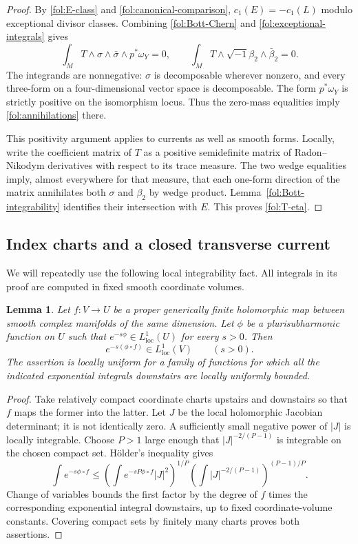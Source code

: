 \documentclass[11pt,letterpaper]{article}
\newtheorem{lemma}[theorem]{Lemma}
\theoremstyle{definition}
\theoremstyle{remark}
\begin{document}
\begin{proof}
By \eqref{fol:E-class} and \eqref{fol:canonical-comparison},
$c_1(E)=-c_1(L)$ modulo exceptional divisor classes.  Combining
\eqref{fol:Bott-Chern} and \eqref{fol:exceptional-integrals} gives
\[
 \int_M T\wedge\sigma\wedge\bar\sigma\wedge p^*\omega_Y=0,
 \qquad
 \int_M T\wedge\sqrt{-1}\beta_2\wedge\bar\beta_2=0.
\]
The integrands are nonnegative: $\sigma$ is decomposable wherever
nonzero, and every three-form on a four-dimensional vector space is
decomposable.  The form $p^*\omega_Y$ is strictly positive on the
isomorphism locus.  Thus the zero-mass equalities imply
\eqref{fol:annihilations} there.

This positivity argument applies to currents as well as smooth forms.
Locally, write the coefficient matrix of $T$ as a positive semidefinite
matrix of Radon--Nikodym derivatives with respect to its trace measure.
The two wedge equalities imply, almost everywhere for that measure, that
each one-form direction of the matrix annihilates both $\sigma$ and
$\beta_2$ by wedge product.  Lemma~\ref{fol:Bott-integrability} identifies
their intersection with $E$.  This proves \eqref{fol:T-eta}.
\end{proof}

\subsection{Index charts and a closed transverse current}

We will repeatedly use the following local integrability fact.  All
integrals in its proof are computed in fixed smooth coordinate volumes.

\begin{lemma}\label{fol:Jacobian-integrability}
Let $f\colon V\to U$ be a proper generically finite holomorphic map
between smooth complex manifolds of the same dimension.  Let $\phi$ be
a plurisubharmonic function on $U$ such that
$e^{-s\phi}\in L^1_{\mathrm{loc}}(U)$ for every $s>0$.  Then
\[
 e^{-s(\phi\circ f)}\in L^1_{\mathrm{loc}}(V)
 \qquad(s>0).
\]
The assertion is locally uniform for a family of functions for which
all the indicated exponential integrals downstairs are locally uniformly
bounded.
\end{lemma}

\begin{proof}
Take relatively compact coordinate charts upstairs and downstairs so that
$f$ maps the former into the latter.  Let $J$ be the local holomorphic
Jacobian determinant; it is not identically zero.  A sufficiently small
negative power of $|J|$ is locally integrable.  Choose $P>1$ large enough
that $|J|^{-2/(P-1)}$ is integrable on the chosen compact set.  H\"older's
inequality gives
\begin{equation}\label{fol:Jacobian-Holder}
 \int e^{-s\phi\circ f}
 \leq
 \left(\int e^{-sP\phi\circ f}|J|^2\right)^{1/P}
 \left(\int |J|^{-2/(P-1)}\right)^{(P-1)/P}.
\end{equation}
Change of variables bounds the first factor by the degree of $f$ times
the corresponding exponential integral downstairs, up to fixed
coordinate-volume constants.  Covering compact sets by finitely many
charts proves both assertions.
\end{proof}
\end{document}
